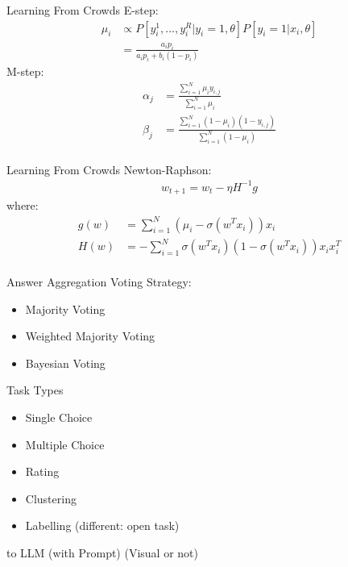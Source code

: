 \documentclass{beamer}
\begin{document}
\begin{frame}{Learning From Crowds}
    E-step:
    \begin{align*}
        \mu_i &\propto P[y^1_i, ..., y^R_i | y_i=1, \theta] P[y_i = 1 | x_i, \theta] \\
        &= \frac{a_ip_i}{a_ip_i + b_i(1-p_i)}
    \end{align*}
    M-step:
    \begin{align*}
        \alpha_j &= \frac{\sum^N_{i=1} \mu_iy_{i,j}}{\sum^N_{i=1} \mu_i} \\
        \beta_j &= \frac{\sum^N_{i=1}(1-\mu_i)(1-y_{i,j})}{\sum^N_{i=1}(1-\mu_i)} \\
    \end{align*}
\end{frame}

\begin{frame}{Learning From Crowds}
    Newton-Raphson:
    \begin{align*}
        w_{t+1} = w_t - \eta H^{-1}g
    \end{align*}
    where:
    \begin{align*}
        g(w) &= \sum^N_{i=1}(\mu_i-\sigma(w^Tx_i)) x_i \\
        H(w) &= -\sum^N_{i=1}\sigma(w^Tx_i)(1-\sigma(w^T x_i)) x_i x_i^T \\
    \end{align*}
\end{frame}

\begin{frame}{Answer Aggregation}
    Voting Strategy:
    \begin{itemize}
        \item Majority Voting
        \item Weighted Majority Voting
        \item Bayesian Voting
    \end{itemize}
\end{frame}

\begin{frame}{Task Types}
    \begin{itemize}
        \item Single Choice
        \item Multiple Choice
        \item Rating
        \item Clustering
        \item Labelling (different: open task)
    \end{itemize}
    to LLM (with Prompt) (Visual or not)
\end{frame}
\end{document}
